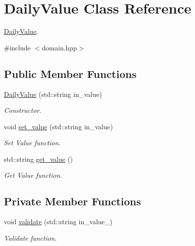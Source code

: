 \hypertarget{classDailyValue}{}\section{Daily\+Value Class Reference}
\label{classDailyValue}


\hyperlink{classDailyValue}{Daily\+Value}.  




{\ttfamily \#include $<$domain.\+hpp$>$}

\subsection*{Public Member Functions}
\begin{DoxyCompactItemize}
\item 
\hyperlink{classDailyValue_ad60e0817a2c4b84f5e2d3e99638de14a}{Daily\+Value} (std\+::string in\+\_\+value)
\begin{DoxyCompactList}\small\item\em Constructor. \end{DoxyCompactList}\item 
void \hyperlink{classDailyValue_ad8caf580e54cd12c29f99f74e2a64af4}{set\+\_\+value} (std\+::string in\+\_\+value)
\begin{DoxyCompactList}\small\item\em Set Value function. \end{DoxyCompactList}\item 
std\+::string \hyperlink{classDailyValue_a3b1b85b388709c44a2781ebf1281c078}{get\+\_\+value} ()
\begin{DoxyCompactList}\small\item\em Get Value function. \end{DoxyCompactList}\end{DoxyCompactItemize}
\subsection*{Private Member Functions}
\begin{DoxyCompactItemize}
\item 
void \hyperlink{classDailyValue_a26a8ab814ba5ea1888ba2c6d1f147e79}{validate} (std\+::string in\+\_\+value\+\_\+)
\begin{DoxyCompactList}\small\item\em Validate function. \end{DoxyCompactList}\end{DoxyCompactItemize}

